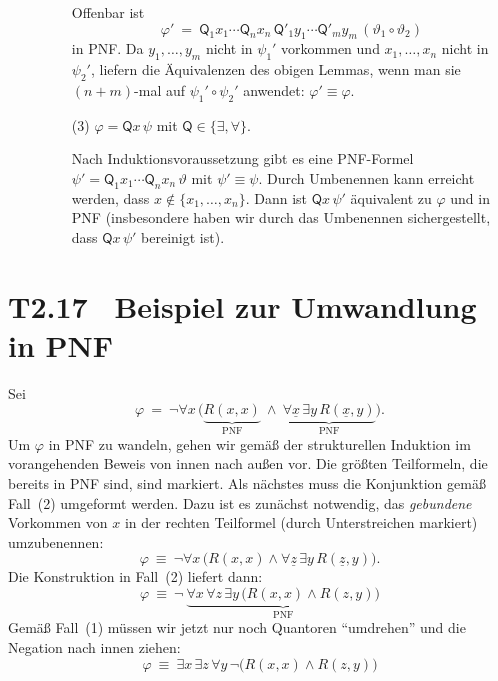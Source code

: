 \documentclass[fontsize=11pt, twoside=false, numbers=autoenddot]{scrbook}
\begin{document}
\begin{beweis}
\begin{description}
\begin{enumerate}
          Offenbar ist
          \[
            \varphi' ~=~ \textsf{Q}_1 x_1 \cdots \textsf{Q}_n x_n \, \textsf{Q}'_1 y_1 \cdots \textsf{Q}'_m y_m\, (\vartheta_1 \circ \vartheta_2)
          \]
          in PNF.
          Da $y_1,\dots,y_m$ nicht in $\psi_1'$ vorkommen 
          und $x_1,\dots,x_n$ nicht in $\psi_2'$,
          liefern die Äquivalenzen des obigen Lemmas,
          wenn man sie $(n+m)$-mal auf $\psi_1' \circ \psi_2'$ anwendet:
          $\varphi' \equiv \varphi$.
          \par\smallskip
        \item[(3)]
          $\varphi = \textsf{Q} x\,\psi$ mit $\textsf{Q} \in \{\exists,\forall\}$.
          \par\smallskip
          Nach Induktionsvoraussetzung gibt es eine PNF-Formel
          $\psi' = \textsf{Q}_1x_1 \cdots \textsf{Q}_nx_n\, \vartheta$
          mit $\psi' \equiv \psi$.
          Durch Umbenennen kann erreicht werden, dass
          $x \notin \{x_1,\dots,x_n\}$.
          Dann ist $\textsf{Q} x\,\psi'$ äquivalent zu $\varphi$ und in PNF
          (insbesondere haben wir durch das Umbenennen sichergestellt,
          dass $\textsf{Q} x\,\psi'$ bereinigt ist).
          \qedhere
      \end{enumerate}
  \end{description}
\end{beweis}%

\section*{T2.17~ Beispiel zur Umwandlung in PNF}

Sei
\[
  \varphi ~=~
  \lnot \forall x\, \Big(
    \underbrace{R(x,x)}_{\text{PNF}}
    ~\land~
    \underbrace{\forall \underline{x}\, \exists y\, R(\underline{x},y)}_{\text{PNF}}
  \Big).
\]
Um $\varphi$ in PNF zu wandeln, gehen wir gemäß der strukturellen Induktion im vorangehenden Beweis
von innen nach außen vor. Die größten Teilformeln, die bereits in PNF sind,
sind markiert.
Als nächstes muss die Konjunktion gemäß Fall~(2) umgeformt werden.
Dazu ist es zunächst notwendig, das \emph{gebundene} Vorkommen von $x$ in der rechten Teilformel
(durch Unterstreichen markiert) umzubenennen:
\[
  \varphi ~\equiv~
  \lnot \forall x\, \Big(
    R(x,x)
    \land
    \forall \underline{z}\, \exists y\, R(\underline{z},y)
  \Big).
\]
Die Konstruktion in Fall~(2) liefert dann:
\[
  \varphi ~\equiv~
  \lnot~ \underbrace{
    \forall x\, \forall z\, \exists y\, \Big(
      R(x,x) \land R(z,y)
    \Big)
  }_{\text{PNF}}
\]
Gemäß Fall~(1) müssen wir jetzt nur noch Quantoren "`umdrehen"'
und die Negation nach innen ziehen:
\[
  \varphi ~\equiv~
  \exists x\, \exists z\, \forall y\, \lnot \Big(
    R(x,x) \land R(z,y)
  \Big)
\]
\end{document}
